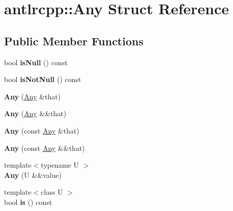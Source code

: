 \hypertarget{structantlrcpp_1_1Any}{}\section{antlrcpp\+:\+:Any Struct Reference}
\label{structantlrcpp_1_1Any}
\subsection*{Public Member Functions}
\begin{DoxyCompactItemize}
\item 
\mbox{\label{structantlrcpp_1_1Any_a488abcfa917d0b5f21d1cf2285d81d78}} 
bool {\bfseries is\+Null} () const
\item 
\mbox{\label{structantlrcpp_1_1Any_aab5861927c245ac28e12a52070b9ef53}} 
bool {\bfseries is\+Not\+Null} () const
\item 
\mbox{\label{structantlrcpp_1_1Any_a6db4c547cf9d695026921fce77bd92a8}} 
{\bfseries Any} (\hyperlink{structantlrcpp_1_1Any}{Any} \&that)
\item 
\mbox{\label{structantlrcpp_1_1Any_ade1fdb5cbfb0644de4eda2d841919718}} 
{\bfseries Any} (\hyperlink{structantlrcpp_1_1Any}{Any} \&\&that)
\item 
\mbox{\label{structantlrcpp_1_1Any_ac68708017cd38b6552f2fd717e9fc516}} 
{\bfseries Any} (const \hyperlink{structantlrcpp_1_1Any}{Any} \&that)
\item 
\mbox{\label{structantlrcpp_1_1Any_a17ea655ba8aeaeef80c0d6b838be2e47}} 
{\bfseries Any} (const \hyperlink{structantlrcpp_1_1Any}{Any} \&\&that)
\item 
\mbox{\label{structantlrcpp_1_1Any_a6124bb282c372a197d0d1182e1278ef9}} 
{\footnotesize template$<$typename U $>$ }\\{\bfseries Any} (U \&\&value)
\item 
\mbox{\label{structantlrcpp_1_1Any_a24ead6d715354e80c5fddc3337cac100}} 
{\footnotesize template$<$class U $>$ }\\bool {\bfseries is} () const

\end{DoxyCompactItemize}
